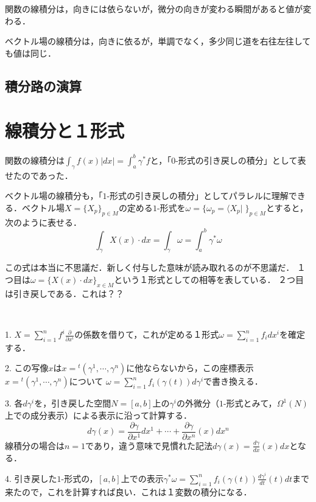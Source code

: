 \documentclass[uplatex, dvipdfmx]{jsreport}
\begin{document}
\begin{screen}
    関数の線積分は，向きには依らないが，微分の向きが変わる瞬間があると値が変わる．

    ベクトル場の線積分は，向きに依るが，単調でなく，多少同じ道を右往左往しても値は同じ．
\end{screen}

\subsection{積分路の演算}

\section{線積分と１形式}
関数の線積分は$\int_\gamma f(x)|dx|=\int^b_a\gamma^*f$と，「$0$-形式の引き戻しの積分」として表せたのであった．
\begin{center}
\end{center}
ベクトル場の線積分も，「$1$-形式の引き戻しの積分」としてパラレルに理解できる．ベクトル場$X=\{X_p\}_{p\in M}$の定める$1$-形式を$\omega=\{\omega_p=\langle X_p|\;\}_{p\in M}$とすると，次のように表せる．
\[ \int_\gamma X(x)\cdot dx=\int_\gamma \omega = \int^b_a\gamma^*\omega \]

\begin{remark}
    この式は本当に不思議だ．新しく付与した意味が読み取れるのが不思議だ．
    １つ目は$\omega=\{X(x)\cdot dx\}_{x\in M}$という１形式としての相等を表している．
    ２つ目は引き戻しである．これは？？
\end{remark}

\begin{proposition}[計算手順]　

    1. $X=\sum^n_{i=1}f^i\frac{\partial}{\partial x^i}$の係数を借りて，これが定める１形式$\omega=\sum^n_{i=1}f_idx^i$を確定する．

    2. この写像$x$は$x={}^t(\gamma^1,\cdots,\gamma^n)$に他ならないから，この座標表示$x={}^t(\gamma^1,\cdots,\gamma^n)$について
    $\omega=\sum^n_{i=1}f_i(\gamma(t))d\gamma^i$で書き換える．

    3. 各$d\gamma^i$を，引き戻した空間$N=[a,b]$上の$\gamma^i$の外微分（$1$-形式とみて，$\Omega^1(N)$上での成分表示）による表示に沿って計算する．
    \[ d\gamma(x)=\frac{\partial \gamma}{\partial x^1}dx^1+\cdots+\frac{\partial\gamma}{\partial x^n}(x)dx^n \]
    線積分の場合は$n=1$であり，違う意味で見慣れた記法$d\gamma (x)=\frac{d\gamma}{dx}(x)dx$となる．

    4. 引き戻した$1$-形式の，$[a,b]$上での表示$\gamma^*\omega=\sum^n_{i=1}f_i(\gamma(t))\frac{d\gamma^i}{dt}(t)dt$まで来たので，これを計算すれば良い．これは１変数の積分になる．
\end{proposition}
\end{document}
